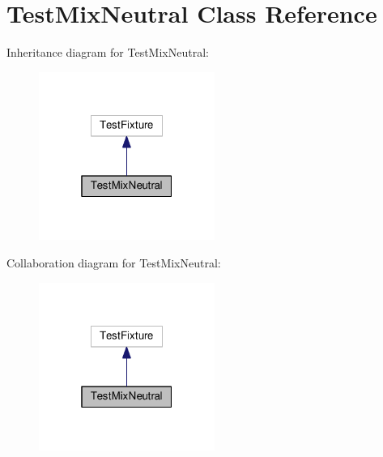 \hypertarget{class_test_mix_neutral}{}\section{Test\+Mix\+Neutral Class Reference}
\label{class_test_mix_neutral}


Inheritance diagram for Test\+Mix\+Neutral\+:
\nopagebreak
\begin{figure}[H]
\begin{center}
\leavevmode
\includegraphics[width=163pt]{class_test_mix_neutral__inherit__graph}
\end{center}
\end{figure}


Collaboration diagram for Test\+Mix\+Neutral\+:
\nopagebreak
\begin{figure}[H]
\begin{center}
\leavevmode
\includegraphics[width=163pt]{class_test_mix_neutral__coll__graph}
\end{center}
\end{figure}
